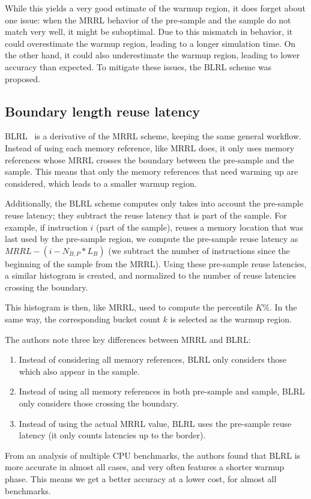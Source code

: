 While this yields a very good estimate of the warmup region, it does forget about one issue: when the MRRL behavior of the pre-sample and the sample do not match very well, it might be suboptimal.
Due to this mismatch in behavior, it could overestimate the warmup region, leading to a longer simulation time.
On the other hand, it could also underestimate the warmup region, leading to lower accuracy than expected.
To mitigate these issues, the BLRL scheme was proposed.

\subsection{Boundary length reuse latency}\label{subsec:blrl}
BLRL~\cite{blrl} is a derivative of the MRRL scheme, keeping the same general workflow.
Instead of using each memory reference, like MRRL does, it only uses memory references whose MRRL crosses the boundary between the pre-sample and the sample.
This means that only the memory references that need warming up are considered, which leads to a smaller warmup region.

Additionally, the BLRL scheme computes only takes into account the pre-sample reuse latency; they subtract the reuse latency that is part of the sample.
For example, if instruction $i$ (part of the sample), reuses a memory location that was last used by the pre-sample region, we compute the pre-sample reuse latency as $MRRL - (i - N_{B,P}*L_B)$ (we subtract the number of instructions since the beginning of the sample from the MRRL).
Using these pre-sample reuse latencies, a similar histogram is created, and normalized to the number of reuse latencies crossing the boundary.

This histogram is then, like MRRL, used to compute the percentile $K\%$.
In the same way, the corresponding bucket count $k$ is selected as the warmup region.

The authors note three key differences between MRRL and BLRL:
\begin{enumerate}
    \item Instead of considering all memory references, BLRL only considers those which also appear in the sample.
    \item Instead of using all memory references in both pre-sample and sample, BLRL only considers those crossing the boundary.
    \item Instead of using the actual MRRL value, BLRL uses the pre-sample reuse latency (it only counts latencies up to the border).
\end{enumerate}

From an analysis of multiple CPU benchmarks, the authors found that BLRL is more accurate in almost all cases, and very often features a shorter warmup phase.
This means we get a better accuracy at a lower cost, for almost all benchmarks.